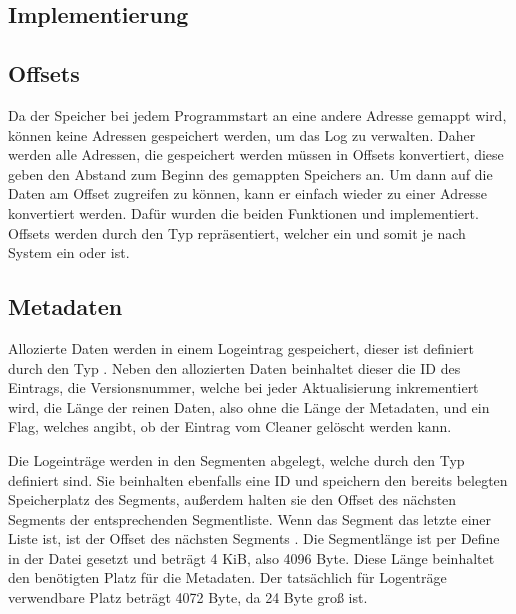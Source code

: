 \documentclass{class/thesis}
\begin{document}
\begin{thesis}
	
	
	\chapter{Implementierung} \label{Implementierung}
	
	\section{Offsets}
	
	Da der Speicher bei jedem Programmstart an eine andere Adresse gemappt wird, können keine Adressen gespeichert werden, um das Log zu verwalten. Daher werden alle Adressen, die gespeichert werden müssen in Offsets konvertiert, diese geben den Abstand zum Beginn des gemappten Speichers an. Um dann auf die Daten am Offset zugreifen zu können, kann er einfach wieder zu einer Adresse konvertiert werden. 
	Dafür wurden die beiden Funktionen  und  implementiert. Offsets werden durch den Typ  repräsentiert, welcher ein  und somit je nach System ein  oder  ist.
	
	
	
	\section{Metadaten}
	
	Allozierte Daten werden in einem Logeintrag gespeichert, dieser ist definiert durch den Typ . Neben den allozierten Daten beinhaltet dieser die ID des Eintrags, die Versionsnummer, welche bei jeder Aktualisierung inkrementiert wird, die Länge der reinen Daten, also ohne die Länge der Metadaten, und ein Flag, welches angibt, ob der Eintrag vom Cleaner gelöscht werden kann.
	
	Die Logeinträge werden in den Segmenten abgelegt, welche durch den Typ  definiert sind. Sie beinhalten ebenfalls eine ID und speichern den bereits belegten Speicherplatz des Segments, außerdem halten sie den Offset des nächsten Segments der entsprechenden Segmentliste. Wenn das Segment das letzte einer Liste ist, ist der Offset des nächsten Segments .
	Die Segmentlänge ist per Define in der Datei  gesetzt und beträgt 4 KiB, also 4096 Byte. Diese Länge beinhaltet den benötigten Platz für die Metadaten. Der tatsächlich für Logenträge verwendbare Platz beträgt 4072 Byte, da  24 Byte groß ist.
	

\end{thesis}
\end{document}
